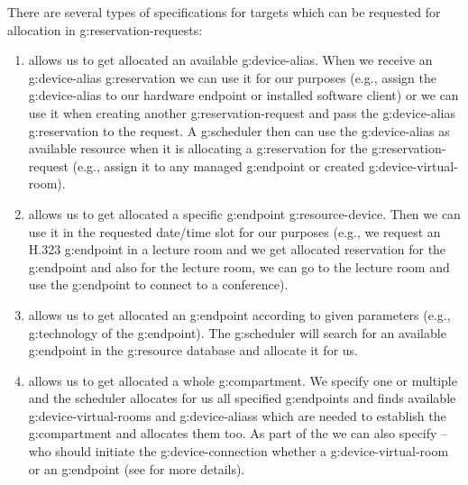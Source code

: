 There are several types of specifications for targets which can be requested for allocation in \glspl{g:reservation-request}:
\begin{enumerate}
\item {} allows us to get allocated an available \gls{g:device-alias}. When we receive an \gls{g:device-alias} \gls{g:reservation} we can use it for our purposes (e.g., assign the \gls{g:device-alias} to our hardware endpoint or installed software client) or we can use it when creating another \gls{g:reservation-request} and pass the \gls{g:device-alias} \gls{g:reservation} to the request. A \gls{g:scheduler} then can use the \gls{g:device-alias} as available resource when it is allocating a \gls{g:reservation} for the \gls{g:reservation-request} (e.g., assign it to any managed \gls{g:endpoint} or created \gls{g:device-virtual-room}). 


\item {} allows us to get allocated a specific \gls{g:endpoint} \gls{g:resource-device}. Then we can use it in the requested date/time slot for our purposes (e.g., we request an H.323 \gls{g:endpoint} in a lecture room and we get allocated reservation for the \gls{g:endpoint} and also for the lecture room, we can go to the lecture room and use the \gls{g:endpoint} to connect to a conference).

\item {} allows us to get allocated an \gls{g:endpoint} according to given parameters (e.g., \gls{g:technology} of the \gls{g:endpoint}). The \gls{g:scheduler} will search for an available \gls{g:endpoint} in the \gls{g:resource} database and allocate it for us.

\item {} allows us to get allocated a whole \gls{g:compartment}. We specify one or multiple  and the scheduler allocates for us all specified \glspl{g:endpoint} and finds available \glspl{g:device-virtual-room} and \glspl{g:device-alias} which are needed to establish the \gls{g:compartment} and allocates them too. As part of the  we can also specify  -- who should initiate the \gls{g:device-connection} whether a \gls{g:device-virtual-room} or an \gls{g:endpoint} (see  for more details).


\end{enumerate}
